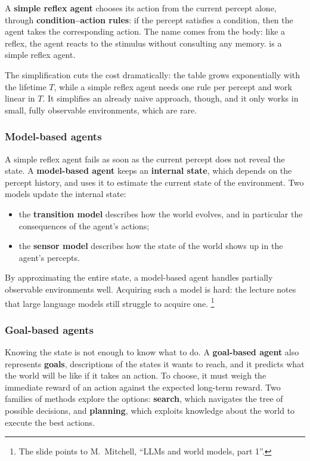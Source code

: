 A \textbf{simple reflex agent} chooses its action from the current percept
alone, through \textbf{condition--action rules}: if the percept satisfies a
condition, then the agent takes the corresponding action. The name comes from
the body: like a reflex, the agent reacts to the stimulus without consulting
any memory.  is a simple reflex agent.

The simplification cuts the cost dramatically: the table grows exponentially
with the lifetime $T$, while a simple reflex agent needs one rule per percept
and work linear in $T$. It simplifies an already naive approach, though, and it
only works in small, fully observable environments, which are rare.

\subsubsection{Model-based agents}\label{sec:agents-model}

A simple reflex agent fails as soon as the current percept does not reveal the
state. A \textbf{model-based agent} keeps an \textbf{internal state}, which
depends on the percept history, and uses it to estimate the current state of
the environment. Two models update the internal state:
\begin{itemize}
  \item the \textbf{transition model} describes how the world evolves, and in
    particular the consequences of the agent's actions;
  \item the \textbf{sensor model} describes how the state of the world shows up
    in the agent's percepts.
\end{itemize}
By approximating the entire state, a model-based agent handles partially
observable environments well. Acquiring such a model is hard: the lecture notes
that large language models still struggle to acquire one.%
\footnote{The slide points to M.~Mitchell, ``LLMs and world models, part 1''.}

\subsubsection{Goal-based agents}\label{sec:agents-goal}

Knowing the state is not enough to know what to do. A \textbf{goal-based agent}
also represents \textbf{goals}, descriptions of the states it wants to reach,
and it predicts what the world will be like if it takes an action. To choose,
it must weigh the immediate reward of an action against the expected long-term
reward. Two families of methods explore the options: \textbf{search}, which
navigates the tree of possible decisions, and \textbf{planning}, which exploits
knowledge about the world to execute the best actions.


